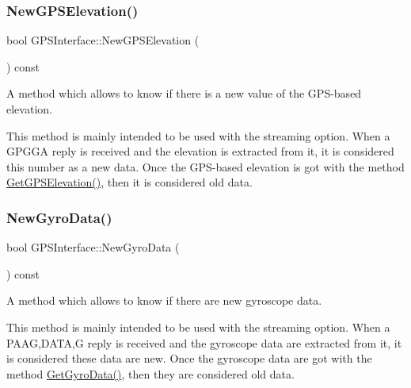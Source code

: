 \subsubsection{\texorpdfstring{New\+G\+P\+S\+Elevation()}{NewGPSElevation()}}
{\footnotesize\ttfamily bool G\+P\+S\+Interface\+::\+New\+G\+P\+S\+Elevation (\begin{DoxyParamCaption}{ }\end{DoxyParamCaption}) const\hspace{0.3cm}{\ttfamily [inline]}}



A method which allows to know if there is a new value of the G\+P\+S-\/based elevation. 

This method is mainly intended to be used with the streaming option. When a G\+P\+G\+GA reply is received and the elevation is extracted from it, it is considered this number as a new data. Once the G\+P\+S-\/based elevation is got with the method \hyperlink{classGPSInterface_a8c71f18097c6486574ae1e5ef84aeb4e}{Get\+G\+P\+S\+Elevation()}, then it is considered old data. \mbox{\label{classGPSInterface_a009d3be64d7b6fbc26f3afc0e6b5e364}} 
\subsubsection{\texorpdfstring{New\+Gyro\+Data()}{NewGyroData()}}
{\footnotesize\ttfamily bool G\+P\+S\+Interface\+::\+New\+Gyro\+Data (\begin{DoxyParamCaption}{ }\end{DoxyParamCaption}) const\hspace{0.3cm}{\ttfamily [inline]}}



A method which allows to know if there are new gyroscope data. 

This method is mainly intended to be used with the streaming option. When a P\+A\+AG,D\+A\+TA,G reply is received and the gyroscope data are extracted from it, it is considered these data are new. Once the gyroscope data are got with the method \hyperlink{classGPSInterface_a808e10398c33792afd17a0868bc37a31}{Get\+Gyro\+Data()}, then they are considered old data. \mbox{\label{classGPSInterface_af4bce28d69aae9fe5d256ad6ec35cd9d}} 
